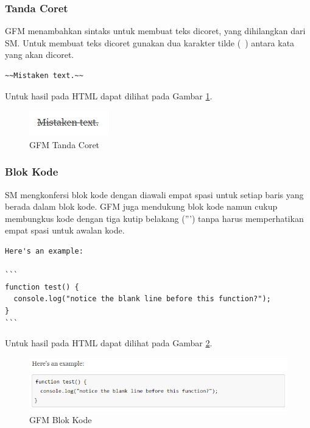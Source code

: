 \subsubsection{Tanda Coret}
GFM menambahkan sintaks untuk membuat teks dicoret, yang dihilangkan dari SM.
Untuk membuat teks dicoret gunakan dua karakter tilde (~) antara kata yang akan
dicoret.
\begin{lstlisting}
~~Mistaken text.~~
\end{lstlisting}
Untuk hasil pada HTML dapat dilihat pada Gambar \ref{fig:tc}.
\begin{figure}[H]
\centering
\includegraphics[scale=1]{Gambar/tc.png}
\caption[GFM Tanda Coret]{GFM Tanda Coret}
\label{fig:tc}
\end{figure}

\subsubsection{Blok Kode}
SM mengkonfersi blok kode dengan diawali empat spasi untuk setiap baris yang
berada dalam blok kode. GFM juga mendukung blok kode namun cukup membungkus kode
dengan tiga kutip belakang (''') tanpa harus memperhatikan empat spasi untuk
awalan kode.
\begin{lstlisting}
Here's an example:

```
function test() {
  console.log("notice the blank line before this function?");
}
```
\end{lstlisting}
Untuk hasil pada HTML dapat dilihat pada Gambar \ref{fig:blokkode}.
\begin{figure}[H]
\centering
\includegraphics[scale=0.6]{Gambar/blokkode.png}
\caption[GFM Blok Kode]{GFM Blok Kode}
\label{fig:blokkode}
\end{figure}

